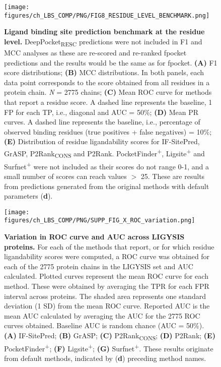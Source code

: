 \begin{longtable}[c]{|c|c|c|c|c|}
\label{tab:residue_level_benchmark}\\
\end{longtable}

\begin{figure}[htbp!]
    \centering
    \texttt{[image: figures/ch\_LBS\_COMP/PNG/FIG8\_RESIDUE\_LEVEL\_BENCHMARK.png]}
    \caption[Ligand binding site prediction benchmark at the residue level]{\textbf{Ligand binding site prediction benchmark at the residue level.} DeepPocket\textsubscript{RESC} predictions were not included in F1 and MCC analyses as these are re-scored and re-ranked fpocket predictions and the results would be the same as for fpocket. \textbf{(A)} F1 score distributions; \textbf{(B)} MCC distributions. In both panels, each data point corresponds to the score obtained from all residues in a protein chain. \textit{N} = 2775 chains; \textbf{(C)} Mean ROC curve for methods that report a residue score. A dashed line represents the baseline, 1 FP for each TP, i.e., diagonal and AUC = 50\%; \textbf{(D)} Mean PR curves. A dashed line represents the baseline, i.e., percentage of observed binding residues (true positives + false negatives) = 10\%; \textbf{(E)} Distribution of residue ligandability scores for IF-SitePred, GrASP, P2Rank\textsubscript{CONS} and P2Rank. PocketFinder\textsuperscript{+}, Ligsite\textsuperscript{+} and Surfnet\textsuperscript{+} were not included as their scores do not range 0-1, and a small number of scores can reach values $>$ 25. These are results from predictions generated from the original methods with default parameters (\textbf{d}).} 
    \label{fig:residue_level_benchmark}
\end{figure}

\begin{figure}[htbp!]
    \centering
    \texttt{[image: figures/ch\_LBS\_COMP/PNG/SUPP\_FIG\_X\_ROC\_variation.png]}
    \caption[Variation in ROC curve and AUC across LIGYSIS proteins]{\textbf{Variation in ROC curve and AUC across LIGYSIS proteins.} For each of the methods that report, or for which residue ligandability scores were computed, a ROC curve was obtained for each of the 2775 protein chains in the LIGYSIS set and AUC calculated. Plotted curves represent the mean ROC curve for each method. These were obtained by averaging the TPR for each FPR interval across proteins. The shaded area represents one standard deviation (1 SD) from the mean ROC curve. Reported AUC is the mean AUC calculated by averaging the AUC for the 2775 ROC curves obtained. Baseline AUC is random chance (AUC = 50\%). \textbf{(A)} IF-SitePred; \textbf{(B)} GrASP; \textbf{(C)} P2Rank\textsubscript{CONS}; \textbf{(D)} P2Rank; \textbf{(E)} PocketFinder\textsuperscript{+}; \textbf{(F)} Ligsite\textsuperscript{+}; \textbf{(G)} Surfnet\textsuperscript{+}. These results originate from default methods, indicated by (\textbf{d}) preceding method names.}
    \label{fig:ROC_variation}
\end{figure}

